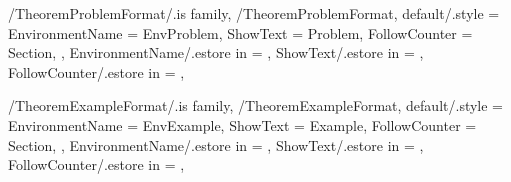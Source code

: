\newcommand{\InitTheoremConditionFormat}
{%
  \theoremstyle{definition}%
  \ifthenelse{\equal{\GetTheoremConditionFormatFollowCounter}{\empty}}%
  {%
    \newtheorem{%
      \GetTheoremConditionFormatEnvironmentName}{%
      \GetTheoremConditionFormatShowText}%
  }%
  {%
    \MappingTheoremCounter[Condition]{\GetTheoremConditionFormatFollowCounter}%
    \newtheorem{%
      \GetTheoremConditionFormatEnvironmentName}{%
      \GetTheoremConditionFormatShowText}[%
      \GetTheoremConditionFormatFollowCounter]%
  }%
} %


\pgfkeys
{
  /TheoremProblemFormat/.is family, /TheoremProblemFormat,
  default/.style =
  {
    EnvironmentName = {EnvProblem},
    ShowText = {Problem},
    FollowCounter = Section,
  },
  EnvironmentName/.estore in = \GetTheoremProblemFormatEnvironmentName,
  ShowText/.estore in = \GetTheoremProblemFormatShowText,
  FollowCounter/.estore in = \GetTheoremProblemFormatFollowCounter,
} %

\newcommand{\InsertProblem}[2][\empty]
{%
  \InsertTheoremContent[#1]{\GetTheoremProblemFormatEnvironmentName}{#2}%
} %

\newcommand{\InitTheoremProblemFormat}
{%
  \theoremstyle{definition}%
  \ifthenelse{\equal{\GetTheoremProblemFormatFollowCounter}{\empty}}%
  {%
    \newtheorem{%
      \GetTheoremProblemFormatEnvironmentName}{%
      \GetTheoremProblemFormatShowText}%
  }%
  {%
    \MappingTheoremCounter[Problem]{\GetTheoremProblemFormatFollowCounter}%
    \newtheorem{%
      \GetTheoremProblemFormatEnvironmentName}{%
      \GetTheoremProblemFormatShowText}[%
      \GetTheoremProblemFormatFollowCounter]%
  }%
} %


\pgfkeys
{
  /TheoremExampleFormat/.is family, /TheoremExampleFormat,
  default/.style =
  {
    EnvironmentName = {EnvExample},
    ShowText = {Example},
    FollowCounter = Section,
  },
  EnvironmentName/.estore in = \GetTheoremExampleFormatEnvironmentName,
  ShowText/.estore in = \GetTheoremExampleFormatShowText,
  FollowCounter/.estore in = \GetTheoremExampleFormatFollowCounter,
} %

\newcommand{\InsertExample}[2][\empty]
{%
  \InsertTheoremContent[#1]{\GetTheoremExampleFormatEnvironmentName}{#2}%
} %

